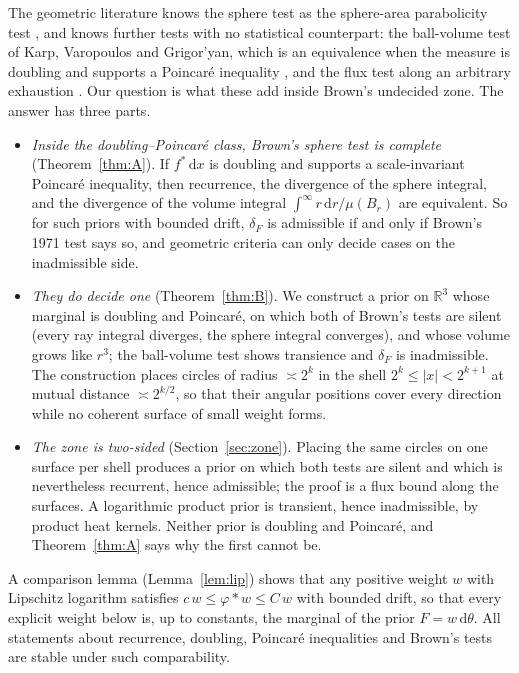 \documentclass[11pt]{amsart}
\newcommand{\R}{\mathbb{R}}
\newcommand{\dd}{\,\mathrm{d}}
\newcommand{\abs}[1]{\lvert #1\rvert}
\theoremstyle{plain}
\theoremstyle{definition}
\theoremstyle{remark}
\begin{document}
The geometric literature knows the sphere test as the sphere-area parabolicity
test \cite[Thm.~7.5]{grigoryan1999}, and knows further tests with no
statistical counterpart: the ball-volume test of Karp, Varopoulos and
Grigor'yan, which is an equivalence when the measure is doubling and supports a
Poincar\'e inequality \cite[Thm.~11.1]{grigoryan1999}, and the flux test along
an arbitrary exhaustion \cite[Thm.~7.6]{grigoryan1999}. Our question is what
these add inside Brown's undecided zone. The answer has three parts.

\begin{itemize}[leftmargin=2em,itemsep=3pt]
\item[(A)] \emph{Inside the doubling--Poincar\'e class, Brown's sphere test is
complete} (Theorem~\ref{thm:A}). If $f^*\dd x$ is doubling and supports a
scale-invariant Poincar\'e inequality, then recurrence, the divergence of the
sphere integral, and the divergence of the volume integral
$\int^\infty r\dd r/\mu(B_r)$ are equivalent. So for such priors with bounded
drift, $\delta_F$ is admissible if and only if Brown's 1971 test says so, and
geometric criteria can only decide cases on the inadmissible side.
\item[(B)] \emph{They do decide one} (Theorem~\ref{thm:B}). We construct a prior
on $\R^3$ whose marginal is doubling and Poincar\'e, on which both of Brown's
tests are silent (every ray integral diverges, the sphere integral converges),
and whose volume grows like $r^3$; the ball-volume test shows transience and
$\delta_F$ is inadmissible. The construction places circles of radius
$\asymp2^k$ in the shell $2^k\le\abs x<2^{k+1}$ at mutual distance $\asymp
2^{k/2}$, so that their angular positions cover every direction while no
coherent surface of small weight forms.
\item[(C)] \emph{The zone is two-sided} (Section~\ref{sec:zone}). Placing the
same circles on one surface per shell produces a prior on which both tests are
silent and which is nevertheless recurrent, hence admissible; the proof is a
flux bound along the surfaces. A logarithmic product prior is transient, hence
inadmissible, by product heat kernels. Neither prior is doubling and Poincar\'e,
and Theorem~\ref{thm:A} says why the first cannot be.
\end{itemize}

A comparison lemma (Lemma~\ref{lem:lip}) shows that any positive weight $w$
with Lipschitz logarithm satisfies $c\,w\le\varphi*w\le C\,w$ with bounded
drift, so that every explicit weight below is, up to constants, the marginal of
the prior $F=w\dd\theta$. All statements about recurrence, doubling, Poincar\'e
inequalities and Brown's tests are stable under such comparability.
\end{document}

